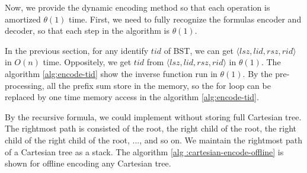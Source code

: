 \iffalse

ISMQ 已知解法有二，其一使用並查集在 $O(\alpha(n))$ 解決單一操作，其二
使用樸素的稀疏表在 $O(\log n)$完成插入操作、$O(1)$ 完成詢問操作。其二，
Fischer \cite{fischer} 提出的 $\theta(n)$ -- $\theta(1)$ 無法應用在此，
其原因在於插入元素時，無法動態決定 in-block 的最大值，必須等到整個
in-block 塞滿至預設值才可解決。

在我們的應用中維護後綴最大值，
拓展其操作成為增長區間最大值查找 (\emph{incremental range maximum query}, IRMQ)，
其支援兩項操作：
\fi

Now, we provide the dynamic encoding method so that each operation is
amortized $\theta(1)$ time.  First, we need to fully recognize the
formulas encoder and decoder, so that each step in the algorithm is
$\theta(1)$.

In the previous section, for any identify $\mathit{tid}$ of BST, we
can get $\langle\mathit{lsz}, \mathit{lid}, \mathit{rsz},
\mathit{rid}\rangle$ in $O(n)$ time.  Oppositely, we get
$\mathit{tid}$ from $\langle\mathit{lsz}, \mathit{lid}, \mathit{rsz},
\mathit{rid}\rangle$ in $\theta(1)$.  The algorithm
\ref{alg:encode-tid} show the inverse function run in $\theta(1)$.  By
the pre-processing, all the prefix sum store in the memory, so the for
loop can be replaced by one time memory access in the algorithm
\ref{alg:encode-tid}.

\iffalse

接下來的幾段中，我們提供動態的編碼方式使得每一操作皆均攤 $\theta(1)$
完成。首先，我們需要充分認知編碼相互轉換的公式，藉以在算法中完成每一步
皆為 $\theta(1)$ 的要求。

在上一節提出對於任意編號 $\mathit{tid}$ 可以在 $O(n)$ 時間內得到
$\langle\mathit{lsz},\mathit{lid},\mathit{rsz},\mathit{rid}\rangle$；
相反地，可以在 $\theta(1)$ 時間內逆推得到 $\mathit{tid}$，如算法
~\ref{alg:encode-tid}。透過預處理，事先將所有前綴和保存下來，在算法中
的迴圈可視為一次內存存取，使得時間複雜度 $\theta(1)$。\fi



By the recursive formula, we could implement without storing full
Cartesian tree.  The rightmost path is consisted of the root, the
right child of the root, the right child of the right child of the
root, ..., and so on.  We maintain the rightmost path of a Cartesian
tree as a stack.  The algorithm \ref{alg :cartesian-encode-offline} is
shown for offline encoding any Cartesian tree.

\iffalse
根據先前的字典順序編碼，只需要維護笛卡爾樹的右鏈，實作上與堆疊結構相同。
基於 row-major 順序和遞迴定義 ~\ref{fun:LCA}，修改之前論文對於的離線編碼，
其對應方案如算法 \ref{alg:cartesian-encode-offline}。
\fi

